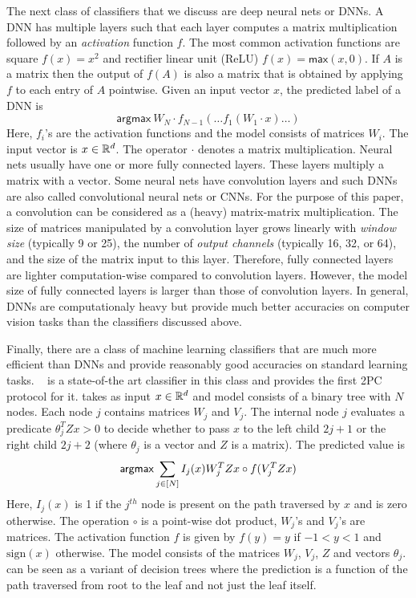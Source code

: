 The next class of classifiers that we discuss are deep neural nets or DNNs. 
A DNN has multiple layers such that each layer computes a matrix multiplication followed by an {\it activation} function $f$. The most common activation functions are square $f(x)=x^2$ and rectifier linear unit (ReLU) $f(x)=\mathsf{max}(x,0)$. 
If $A$ is a matrix then the output of $f(A)$ is also a matrix that is obtained by applying $f$ to each entry of $A$ pointwise.
Given an input vector $x$, the predicted label of a DNN is
\[
 \mathsf{argmax}\ W_N\cdot f_{N-1}(\ldots f_1(W_1\cdot x)\ldots)
\]
Here, $f_i$'s are the  activation functions and the model consists of matrices $W_i$. The input vector is $x \in {\mathbb{R}}^d$.
The operator $\cdot$ denotes a matrix multiplication.
Neural nets usually have one or more fully connected layers.
These layers multiply a matrix with a vector.
Some neural nets have convolution layers and such DNNs are also called convolutional neural nets or CNNs.
For the purpose of this paper, a convolution can be considered as a (heavy) matrix-matrix multiplication. The size of matrices manipulated by a convolution layer grows linearly with {\it window size} (typically 9 or 25), the number of {\it output channels} (typically 16, 32, or 64), and the size of the matrix input to this layer. 
Therefore, fully connected layers are lighter computation-wise compared
to convolution layers. However, the model size of fully connected layers is larger than those of convolution layers.
In general, DNNs are computationaly heavy but provide
much better accuracies on computer vision tasks than the classifiers discussed above. 

Finally, there are a class of machine learning classifiers that are much more efficient than
DNNs and provide reasonably good accuracies on standard learning tasks. \bonsai~\cite{bonsai} is a state-of-the art classifier in this class and \tool provides the first 2PC protocol for it.
\bonsai takes as input $x \in {\mathbb{R}}^d$ and model consists of a binary tree with $N$ nodes. Each node $j$ contains matrices $W_j$ and $V_j$. The internal node $j$  evaluates a predicate $\theta_j^TZx > 0$ to decide whether
to pass $x$ to the left child $2j+1$ or the right child $2j+2$ (where $\theta_j$ is a vector and $Z$ is a matrix).
The predicted value is
\[
{\sf argmax} \sum_{j\in [N]} I_j(x)W_j^TZx\circ f(V_j^TZx) 
\]
Here, $I_j(x)$ is 1 if the $j^{th}$ node is present on the path traversed by $x$
and is zero otherwise. 
The operation $\circ$ is a point-wise dot product, $W_j$'s and $V_j$'s are matrices. The activation function $f$ is given by $f(y) = y$ if $-1 < y < 1$ and $\mathrm{sign}(x)$ otherwise. The model consists of the matrices $W_j$, $V_j$, $Z$ and vectors $\theta_j$. \bonsai can be seen as a variant of decision trees where the prediction is a function of the path traversed from root to the leaf and not just the leaf itself.

